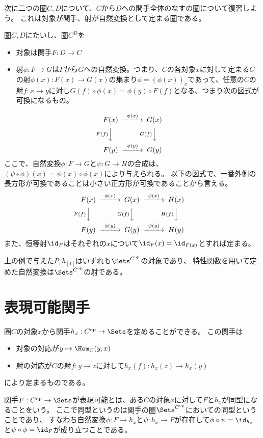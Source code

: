 \documentclass[uplatex]{jsarticle}
\begin{document}
次に二つの圏$C, D$について、$C$から$D$への関手全体のなすの圏について復習しよう。
これは対象が関手、射が自然変換として定まる圏である。
\begin{dfn}
圏$C, D$にたいし、圏$C^D$を
\begin{itemize}
\item 対象は関手$F:D\to C$
\item 射$\phi:F\to G$は$F$から$G$への自然変換。つまり、$C$の各対象$x$に対して定まる$C$の射$\phi(x):F(x)\to G(x)$の集まり$\phi=(\phi(x))_x$であって、任意の$C$の射$f:x\to y$に対し$G(f)\circ\phi(x)=\phi(y)\circ F(f)$となる、つまり次の図式が可換になるもの。
\end{itemize}
\[
\begin{CD}
F(x)@>\phi(x)>>G(x)\\
@VF(f)VV@VG(f)VV\\
F(y)@>\phi(y)>>G(y)
\end{CD}
\]
ここで、自然変換$\phi:F \to G$と$\psi:G\to H$の合成は、$(\psi\circ\phi)(x)=\psi(x)\circ \phi(x)$により与えられる。
以下の図式で、一番外側の長方形が可換であることは小さい正方形が可換であることから言える。
\[
\begin{CD}
F(x)@>\phi(x)>>G(x)@>\psi(x)>>H(x)\\
@VF(f)VV@VG(f)VV@VH(f)VV\\
F(y)@>\phi(y)>>G(y)@>\psi(y)>>H(y)
\end{CD}
\]
また、恒等射$\id_F$はそれぞれの$x$について$\id_F(x)=\id_{F(x)}$とすれば定まる。
\end{dfn}

上の例で与えた$P, h_{[1]}$はいずれも$\Sets^{C^{\rm op}}$の対象であり、
特性関数を用いて定めた自然変換は$\Sets^{C^{\rm op}}$の射である。

\section{表現可能関手}
圏$C$の対象$x$から関手$h_x:C^{\rm op} \to \Sets$を定めることができる。
この関手は
\begin{itemize}
\item 対象の対応が$y \mapsto \Hom_C(y,x)$
\item 射の対応が$C$の射$f:y \to z$に対して$h_x(f):h_x(z) \to h_x(y)$
\end{itemize}
により定まるものである。

\begin{dfn}
関手$F:C^{\rm op}\to\Sets$が表現可能とは、ある$C$の対象$x$に対して$F$と$h_x$が同型になることをいう。
ここで同型というのは関手の圏$\Sets^{C^{\rm op}}$においての同型ということであり、
すなわち自然変換$\phi:F \to h_x$と$\psi:h_x \to F$が存在して$\phi\circ\psi=\id_{h_x}$と$\psi\circ\phi=\id_F$が成り立つことである。
\end{dfn}
\end{document}
